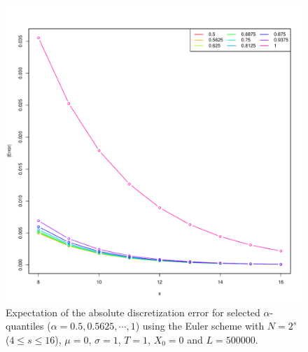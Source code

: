 \documentclass[cjk]{beamer}
\begin{document}
\begin{frame}
\begin{figure}
   \includegraphics[scale=0.4]{nout_0a.pdf}
   \caption{Expectation of the absolute discretization error for selected $\alpha$-quantiles ($\alpha = 0.5, 0.5625, \cdots, 1$) using the Euler scheme with $N = 2^s$ ($4\le s \le 16$), $\mu=0$, $\sigma=1$, $T=1$, $X_0=0$ and $L=500000$. }
\label{f:ab}
\end{figure}
\end{frame}
\end{document}
